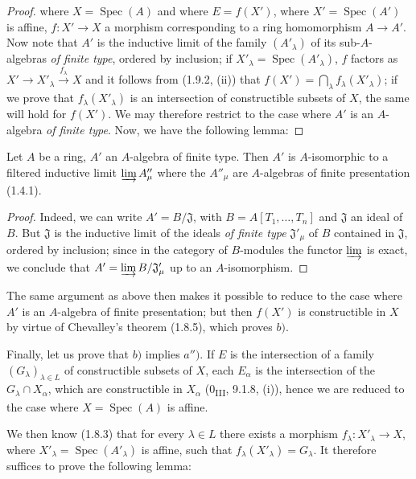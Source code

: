 \begin{proof}
where $X=\operatorname{Spec}(A)$ and where $E=f(X')$, where
$X'=\operatorname{Spec}(A')$ is affine, $f:X'\to X$ a morphism
corresponding to a ring homomorphism $A\to A'$. Now note that
$A'$ is the inductive limit of the family $(A'_\lambda)$ of its
sub-$A$-algebras \emph{of finite type}, ordered by inclusion; if
$X'_\lambda=\operatorname{Spec}(A'_\lambda)$, $f$ factors as
$X'\to X'_\lambda\xrightarrow{f_\lambda}X$ and it follows from (1.9.2, (ii))
that $f(X')=\bigcap_\lambda f_\lambda(X'_\lambda)$; if we prove
that $f_\lambda(X'_\lambda)$ is an intersection of constructible subsets of
$X$, the same will hold for $f(X')$. We may therefore restrict to the case
where $A'$ is an $A$-algebra \emph{of finite type}. Now, we have the
following lemma:
\end{proof}

\begin{lemma}[1.9.3.1]
\label{IV.1.9.3.1}
Let $A$ be a ring, $A'$ an $A$-algebra of finite type. Then $A'$ is
$A$-isomorphic to a filtered inductive limit $\varinjlim A''_\mu$ where the
$A''_\mu$ are $A$-algebras of finite presentation (1.4.1).
\end{lemma}

\begin{proof}
Indeed, we can write $A'=B/\mathfrak J$, with
$B=A[T_1,\ldots,T_n]$ and $\mathfrak J$ an ideal of $B$. But $\mathfrak J$
is the inductive limit of the ideals \emph{of finite type} $\mathfrak J'_\mu$
of $B$ contained in $\mathfrak J$, ordered by inclusion; since in the
category of $B$-modules the functor $\varinjlim$ is exact, we conclude
that $A'=\varinjlim B/\mathfrak J'_\mu$ up to an $A$-isomorphism.
\end{proof}

The same argument as above then makes it possible to reduce to the case where
$A'$ is an $A$-algebra of finite presentation; but then $f(X')$ is
constructible in $X$ by virtue of Chevalley's theorem (1.8.5), which
proves $b)$.

Finally, let us prove that $b)$ implies $a'')$. If $E$ is the intersection of
a family $(G_\lambda)_{\lambda\in L}$ of constructible subsets of $X$,
each $E_\alpha$ is the intersection of the $G_\lambda\cap X_\alpha$, which are
constructible in $X_\alpha$ (0\textsubscript{III}, 9.1.8, (i)), hence we
are reduced to the case where $X=\operatorname{Spec}(A)$ is affine.

We then know (1.8.3) that for every $\lambda\in L$ there exists a morphism
$f_\lambda:X'_\lambda\to X$, where
$X'_\lambda=\operatorname{Spec}(A'_\lambda)$ is affine, such that
$f_\lambda(X'_\lambda)=G_\lambda$. It therefore suffices to prove the
following lemma:

